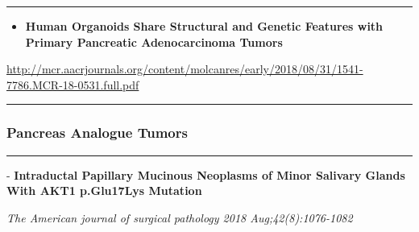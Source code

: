 \documentclass[]{article}
\providecommand{\tightlist}{%
  \setlength{\itemsep}{0pt}\setlength{\parskip}{0pt}}
\begin{document}
\begin{center}\rule{0.5\linewidth}{\linethickness}\end{center}

\begin{itemize}
\tightlist
\item
  \textbf{Human Organoids Share Structural and Genetic Features with
  Primary Pancreatic Adenocarcinoma Tumors}
\end{itemize}

\url{http://mcr.aacrjournals.org/content/molcanres/early/2018/08/31/1541-7786.MCR-18-0531.full.pdf}

\begin{center}\rule{0.5\linewidth}{\linethickness}\end{center}

\hypertarget{pancreas-analogue-tumors}{%
\subsubsection{Pancreas Analogue
Tumors}\label{pancreas-analogue-tumors}}

\begin{center}\rule{0.5\linewidth}{\linethickness}\end{center}

 - \textbf{Intraductal Papillary Mucinous Neoplasms of Minor Salivary
Glands With AKT1 p.Glu17Lys Mutation}

\emph{The American journal of surgical pathology 2018
Aug;42(8):1076-1082}
\end{document}
